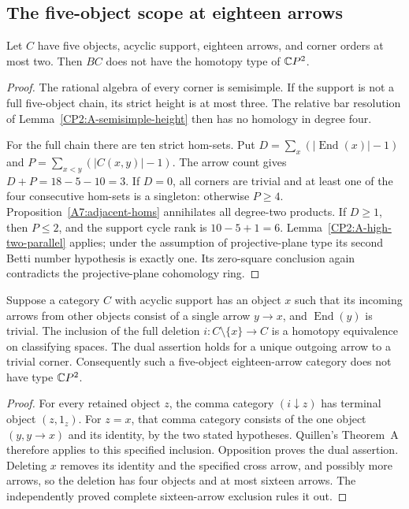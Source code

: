 \subsection{The five-object scope at eighteen arrows}

\begin{lemma}
\label{CP2:A-five18-semisimple-small}
Let $C$ have five objects, acyclic support, eighteen arrows,
and corner orders at most two. Then $BC$ does not have the
homotopy type of $\mathbb{C}P^2$.
\end{lemma}
\begin{proof}
The rational algebra of every corner is semisimple. If the
support is not a full five-object chain, its strict height
is at most three. The relative bar resolution of
Lemma~\ref{CP2:A-semisimple-height} then has no homology in
degree four.

For the full chain there are ten strict hom-sets. Put
$D=\sum_x(|\operatorname{End}(x)|-1)$ and
$P=\sum_{x<y}(|C(x,y)|-1)$. The arrow count gives
$D+P=18-5-10=3$. If $D=0$, all corners are trivial and
at least one of the four consecutive hom-sets is a
singleton: otherwise $P\geq4$. Proposition~\ref{A7:adjacent-homs}
annihilates all degree-two products. If $D\geq1$, then
$P\leq2$, and the support cycle rank is $10-5+1=6$.
Lemma~\ref{CP2:A-high-two-parallel} applies; under the
assumption of projective-plane type its second Betti number
hypothesis is exactly one. Its zero-square conclusion again
contradicts the projective-plane cohomology ring.
\end{proof}

\begin{lemma}
\label{CP2:A-five18-singleton-deletion}
Suppose a category $C$ with acyclic support has an object $x$
such that its incoming arrows from other objects consist
of a single arrow $y\to x$, and $\operatorname{End}(y)$ is
trivial. The inclusion of the full deletion
$i:C\setminus\{x\}\longrightarrow C$ is a homotopy
equivalence on classifying spaces. The dual assertion
holds for a unique outgoing arrow to a trivial corner.
Consequently such a five-object eighteen-arrow category
does not have type $\mathbb{C}P^2$.
\end{lemma}
\begin{proof}
For every retained object $z$, the comma category
$(i\downarrow z)$ has terminal object $(z,1_z)$.
For $z=x$, that comma category consists of the one object
$(y,y\to x)$ and its identity, by the two stated hypotheses.
Quillen's Theorem~A therefore applies to this specified
inclusion. Opposition proves the dual assertion.
Deleting $x$ removes its identity and the specified cross
arrow, and possibly more arrows, so the deletion has four
objects and at most sixteen arrows. The independently
proved complete sixteen-arrow exclusion rules it out.
\end{proof}

